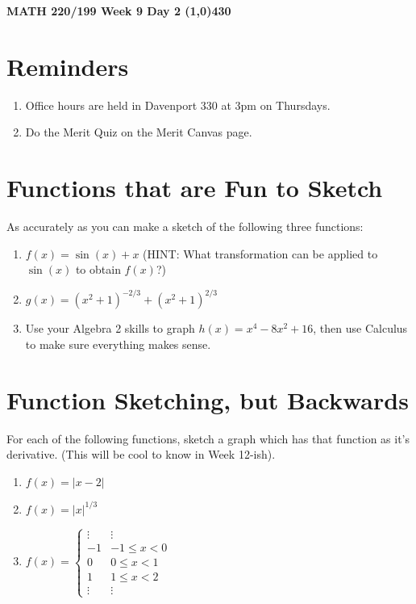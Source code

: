 \documentclass{article}
\begin{document}
\begin{center}
 \LARGE\bfseries MATH 220/199 Week 9 Day 2
 \line(1,0){430}
\end{center}
\section*{Reminders}
\begin{enumerate}
    \item Office hours are held in Davenport 330 at 3pm on Thursdays.
    \item Do the Merit Quiz on the Merit Canvas page.
\end{enumerate}
\section*{Functions that are Fun to Sketch}
As accurately as you can make a sketch of the following three functions:
\begin{enumerate}
    \item $f(x) = \sin(x)+x$ (HINT: What transformation can be applied to $\sin(x)$ to obtain $f(x)$?)
    \vfill
    \item $g(x) = (x^2+1)^{-2/3}+(x^2+1)^{2/3}$
    \vfill
    \item Use your Algebra 2 skills to graph $h(x) = x^4-8x^2+16$, then use Calculus to make sure everything makes sense.
    \vfill
\end{enumerate}
\newpage
\section*{Function Sketching, but Backwards}
For each of the following functions, sketch a graph which has that function as it's derivative. (This will be cool to know in Week 12-ish).
\begin{enumerate}
    \item $f(x) = |x-2|$
    \vfill
    \item $f(x) = |x|^{1/3}$
    \vfill
    \item $f(x) = \begin{cases}
        \vdots & \vdots\\
        -1 & -1 \leq x < 0\\
        0 & 0 \leq x < 1\\
        1 & 1 \leq x < 2\\
        \vdots & \vdots
    \end{cases}$
    \vfill
\end{enumerate}
\end{document}
